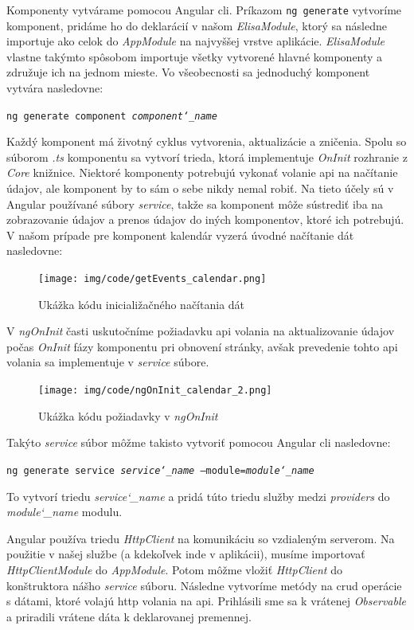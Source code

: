 Komponenty vytvárame pomocou Angular \acrshort{cli}. Príkazom \texttt{ng generate} vytvoríme komponent,
pridáme ho do deklarácií v našom \textit{ElisaModule}, ktorý sa následne importuje ako celok do
\textit{AppModule} na najvyššej vrstve aplikácie. \textit{ElisaModule} vlastne takýmto spôsobom importuje všetky
vytvorené hlavné komponenty a združuje ich na jednom mieste.
Vo všeobecnosti sa jednoduchý komponent vytvára nasledovne:

 \texttt{ng generate component  \textit{component\char`_name}}

Každý komponent má životný cyklus vytvorenia, aktualizácie a zničenia.
Spolu so súborom \textit{.ts} komponentu sa vytvorí trieda, ktorá implementuje \textit{OnInit} rozhranie z \textit{Core} knižnice.
Niektoré komponenty potrebujú vykonať volanie \acrshort{api} na načítanie údajov, ale komponent by to sám
o sebe nikdy nemal robiť. Na tieto účely sú v Angular používané súbory \textit{service}, takže sa
komponent môže sústrediť iba na zobrazovanie údajov a prenos údajov do iných komponentov,
ktoré ich potrebujú. V našom prípade pre komponent kalendár vyzerá úvodné načítanie dát nasledovne:

\newpage
\begin{figure}[ht]
  \centering
  \texttt{[image: img/code/getEvents\_calendar.png]}
  \caption{\label{fig:getEvents_calendar} Ukážka kódu inicialižačného načítania dát}
\end{figure}

V \textit{ngOnInit} časti uskutočníme požiadavku \acrshort{api} volania na aktualizovanie údajov
počas \textit{OnInit} fázy komponentu pri obnovení stránky, avšak prevedenie tohto \acrshort{api}
volania sa implementuje v \textit{service} súbore.

\begin{figure}[ht]
  \centering
  \texttt{[image: img/code/ngOnInit\_calendar\_2.png]}
  \caption{\label{fig:ngOnInit_calendar_2} Ukážka kódu požiadavky v \textit{ngOnInit}}
\end{figure}

Takýto \textit{service} súbor môžme takisto vytvoriť pomocou Angular \acrshort{cli} nasledovne:

 \texttt{ng generate service \textit{service\char`_name} --module=\textit{module\char`_name}}

To vytvorí triedu \textit{service\char`_name} a pridá túto triedu služby medzi \textit{providers}
do \textit{module\char`_name} modulu.

Angular používa triedu \textit{HttpClient} na komunikáciu so vzdialeným serverom. Na použitie 
v našej službe (a kdekoľvek inde v aplikácii), musíme importovať \textit{HttpClientModule}
do \textit{AppModule}. Potom môžme vložiť \textit{HttpClient} do konštruktora nášho \textit{service} súboru.
Následne vytvoríme metódy na \acrshort{crud} operácie s dátami, ktoré volajú \acrshort{http} volania na \acrshort{api}.
Prihlásili sme sa k vrátenej \textit{Observable} a priradili vrátene dáta k deklarovanej premennej.

